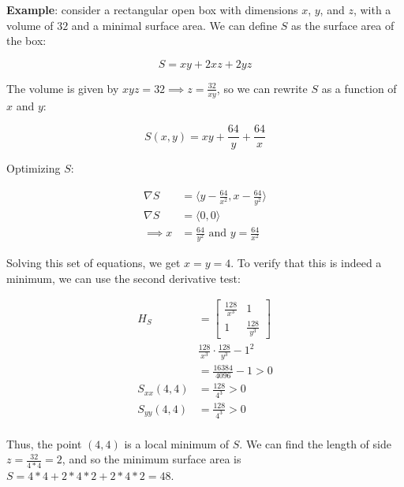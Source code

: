 \documentclass[12pt]{article}
\begin{document}
{%

\textbf{Example}: consider a rectangular open box with dimensions $x$, $y$, and $z$, with a volume of $32$ and a minimal surface area. We can define $S$ as the surface area of the box:

\begin{equation*}
    S = xy + 2xz + 2yz
\end{equation*}

The volume is given by $xyz = 32 \implies z = \frac{32}{xy}$, so we can rewrite $S$ as a function of $x$ and $y$:

\begin{equation*}
    S(x,y) = xy + \frac{64}{y} + \frac{64}{x}
\end{equation*}

Optimizing $S$:

\begin{align*}
    \nabla S &= \langle y - \frac{64}{x^2}, x - \frac{64}{y^2}\rangle\\
    \nabla S &= \langle 0, 0\rangle\\
    \implies x &= \frac{64}{y^2} \text{ and } y = \frac{64}{x^2}
\end{align*}

Solving this set of equations, we get $x = y = 4$. To verify that this is indeed a minimum, we can use the second derivative test:

\begin{align*}
    H_S &= \begin{bmatrix}
        \frac{128}{x^3} & 1\\
        1 & \frac{128}{y^3}
    \end{bmatrix}\\
    &\frac{128}{x^3} \cdot \frac{128}{y^3} - 1^2\\
    &= \frac{16384}{4096}-1 > 0\\
    S_{xx}(4,4) &= \frac{128}{4^3} > 0\\
    S_{yy}(4,4) &= \frac{128}{4^3} > 0\\
\end{align*}

Thus, the point $(4,4)$ is a local minimum of $S$. We can find the length of side $z = \frac{32}{4*4} = 2$, and so the minimum surface area is $S = 4*4 + 2*4*2 + 2*4*2 = 48$.

}
\end{document}
